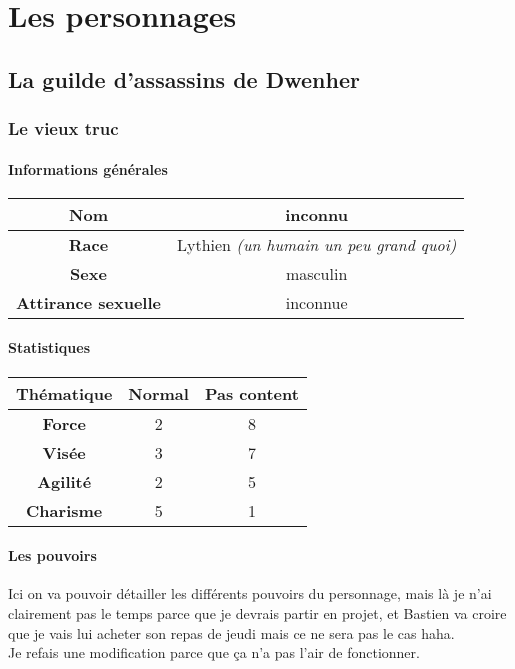 \documentclass[11pt,a4paper]{book}
\begin{document}
\chapter{Les personnages}

\section{La guilde d'assassins de Dwenher}

\subsection{Le vieux truc}

\subsubsection{Informations générales}

\begin{tabular}{|c|c|}
\hline
\textbf{Nom} & inconnu \\
\hline
\textbf{Race} & Lythien \textit{(un humain un peu grand quoi)} \\
\hline
\textbf{Sexe} & masculin \\
\hline
\textbf{Attirance sexuelle} & inconnue \\
\hline
\end{tabular}

\subsubsection{Statistiques}

\begin{tabular}{|c|c|c|}
\hline
\textbf{Thématique} & \textbf{Normal} & \textbf{Pas content} \\
\hline
\textbf{Force} & 2 & 8 \\
\hline
\textbf{Visée} & 3 & 7 \\
\hline
\textbf{Agilité} & 2 & 5 \\
\hline
\textbf{Charisme} & 5 & 1 \\
\hline
\end{tabular}

\subsubsection{Les pouvoirs}

Ici on va pouvoir détailler les différents pouvoirs du personnage, mais là je n'ai clairement pas le temps parce que je devrais partir en projet, et Bastien va croire que je vais lui acheter son repas de jeudi mais ce ne sera pas le cas haha. \\
Je refais une modification parce que ça n'a pas l'air de fonctionner.
\end{document}

